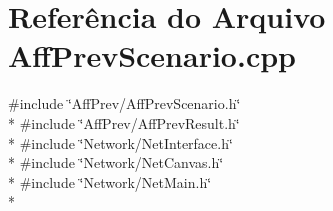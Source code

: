 \section{Referência do Arquivo Aff\+Prev\+Scenario.\+cpp}
\label{_aff_prev_scenario_8cpp}
{\ttfamily \#include \char`\"{}Aff\+Prev/\+Aff\+Prev\+Scenario.\+h\char`\"{}}\\*
{\ttfamily \#include \char`\"{}Aff\+Prev/\+Aff\+Prev\+Result.\+h\char`\"{}}\\*
{\ttfamily \#include \char`\"{}Network/\+Net\+Interface.\+h\char`\"{}}\\*
{\ttfamily \#include \char`\"{}Network/\+Net\+Canvas.\+h\char`\"{}}\\*
{\ttfamily \#include \char`\"{}Network/\+Net\+Main.\+h\char`\"{}}\\*
